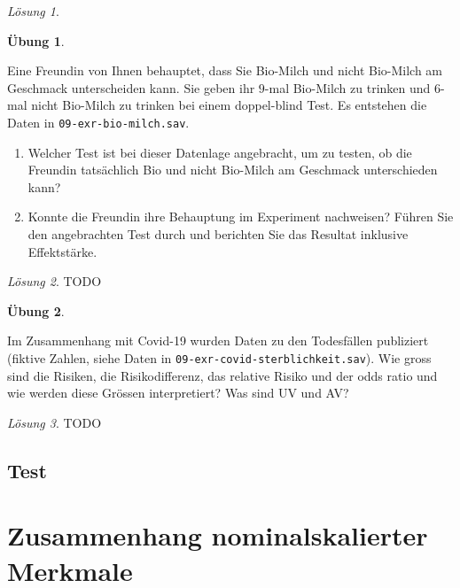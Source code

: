 \documentclass[
]{book}
\providecommand{\tightlist}{%
  \setlength{\itemsep}{0pt}\setlength{\parskip}{0pt}}
\theoremstyle{definition}
\theoremstyle{definition}
\theoremstyle{definition}
\newtheorem{exercise}{Übung}[chapter]
\theoremstyle{definition}
\theoremstyle{remark}
\newtheorem*{solution}{Lösung}
\begin{document}
\begin{solution}
\end{solution}

\begin{exercise}
\protect\hypertarget{exr:bio-milch}{}\label{exr:bio-milch}\leavevmode

Eine Freundin von Ihnen behauptet, dass Sie Bio-Milch und nicht
Bio-Milch am Geschmack unterscheiden kann. Sie geben ihr \(9\)-mal
Bio-Milch zu trinken und \(6\)-mal nicht Bio-Milch zu trinken bei einem
doppel-blind Test. Es entstehen die Daten in
\texttt{09-exr-bio-milch.sav}.

\begin{enumerate}
\def\labelenumi{\alph{enumi})}
\tightlist
\item
  Welcher Test ist bei dieser Datenlage angebracht, um zu testen, ob
  die Freundin tatsächlich Bio und nicht Bio-Milch am Geschmack
  unterschieden kann?
\item
  Konnte die Freundin ihre Behauptung im Experiment nachweisen? Führen
  Sie den angebrachten Test durch und berichten Sie das Resultat
  inklusive Effektstärke.
\end{enumerate}

\end{exercise}

\begin{solution}
TODO
\end{solution}

\begin{exercise}
\protect\hypertarget{exr:covid-sterblichkeit}{}\label{exr:covid-sterblichkeit}\leavevmode

Im Zusammenhang mit Covid-19 wurden Daten zu den Todesfällen publiziert
(fiktive Zahlen, siehe Daten in
\texttt{09-exr-covid-sterblichkeit.sav}). Wie gross sind die
Risiken, die Risikodifferenz, das relative Risiko und der odds ratio und
wie werden diese Grössen interpretiert? Was sind UV und AV?

\end{exercise}

\begin{solution}
TODO
\end{solution}

\section{Test}\label{test-5}

\chapter{Zusammenhang nominalskalierter Merkmale}\label{zusammenhang-nominalskalierter-merkmale}
\end{document}
